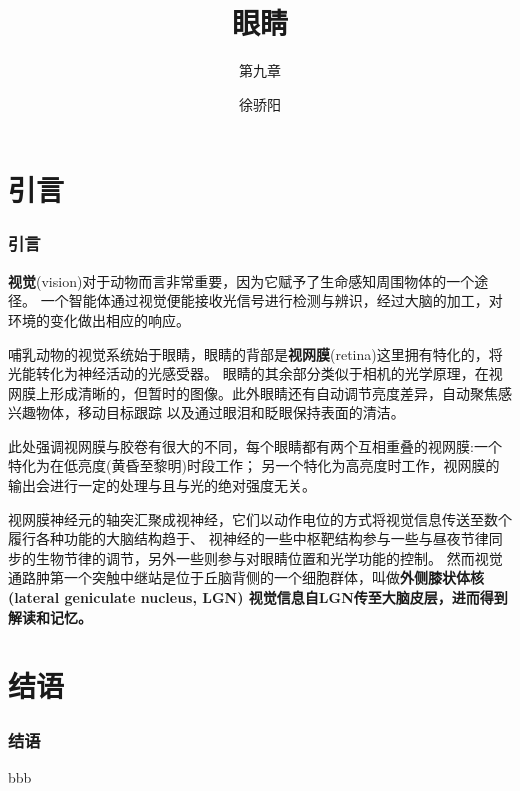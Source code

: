 \documentclass[UTF8]{ctexbeamer}
\title[眼睛] %
{眼睛}
\subtitle{第九章}
\author[]{徐骄阳} %
\institute[系统科学学院]{系统科学学院} %
\date[\today]{} %
\begin{document}
\frame{\titlepage}
\section*{引言}
\begin{frame}
    \frametitle{引言}

    \textbf{视觉}(vision)对于动物而言非常重要，因为它赋予了生命感知周围物体的一个途径。
    一个智能体通过视觉便能接收光信号进行检测与辨识，经过大脑的加工，对环境的变化做出相应的响应。

    哺乳动物的视觉系统始于眼睛，眼睛的背部是\textbf{视网膜}(retina)这里拥有特化的，将光能转化为神经活动的光感受器。
    眼睛的其余部分类似于相机的光学原理，在视网膜上形成清晰的，但暂时的图像。此外眼睛还有自动调节亮度差异，自动聚焦感兴趣物体，移动目标跟踪
    以及通过眼泪和眨眼保持表面的清洁。
    
    此处强调视网膜与胶卷有很大的不同，每个眼睛都有两个互相重叠的视网膜:一个特化为在低亮度(黄昏至黎明)时段工作；
    另一个特化为高亮度时工作，视网膜的输出会进行一定的处理与且与光的绝对强度无关。

    视网膜神经元的轴突汇聚成视神经，它们以动作电位的方式将视觉信息传送至数个履行各种功能的大脑结构趋于、
    视神经的一些中枢靶结构参与一些与昼夜节律同步的生物节律的调节，另外一些则参与对眼睛位置和光学功能的控制。
    然而视觉通路肿第一个突触中继站是位于丘脑背侧的一个细胞群体，叫做\bf{外侧膝状体核}(lateral geniculate nucleus, LGN)
    视觉信息自LGN传至大脑皮层，进而得到解读和记忆。
\end{frame}








\section*{结语}
\begin{frame}
    \frametitle{结语}

    bbb

\end{frame}
\end{document}
